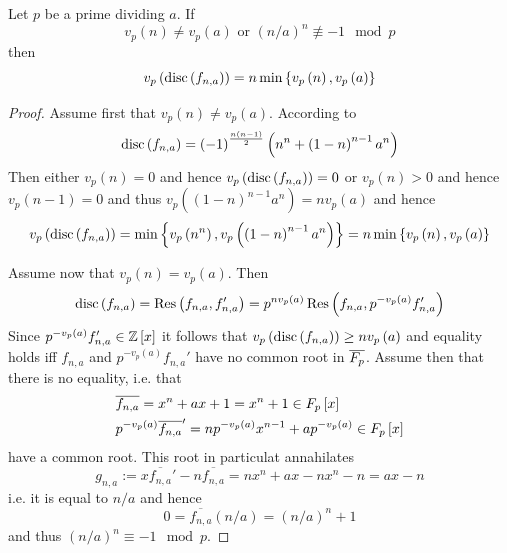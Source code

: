 \documentclass[../main.tex]{subfiles}
\begin{document}
\begin{lemma}
  \label{lem:valuation_of_disc}
  Let $p$ be a prime dividing $a$.
  If 
  \[
    v_p\left( n \right) \neq v_p\left( a \right) \text{ or } \left( n / a \right)^n \not \equiv -1 \mod p
  \]
  then 
  \[
    v_p\left( \operatorname{disc}\left( f_{n,a} \right) \right) = n \min\left\{  
      v_p\left( n \right), v_p\left( a \right) 
    \right\}
  \] 
\end{lemma}
\begin{proof}
  Assume first that $v_p\left( n \right) \neq v_p\left( a \right)$.
  According to \cite[Theorem 2]{Swan62}
  \[
    \operatorname{disc}\left( f_{n,a} \right) = 
    \left( -1 \right)^{\frac{n(n-1)}{2}} \left(  
      n^n + \left( 1 - n \right)^{n - 1} a^n
    \right)
  \]
  Then either $v_p\left( n \right) = 0$ and hence $v_p\left( \operatorname{disc}\left( f_{n,a} \right) \right) = 0$ or $v_p\left( n \right) > 0$ and hence $v_p\left( n - 1 \right) = 0$ and thus $v_p\left( \left( 1 - n \right)^{n - 1} a^n \right) = n v_p\left( a \right)$ and hence 
  \[
    v_p\left( \operatorname{disc}\left( f_{n,a} \right) \right) = 
    \min\left\{ v_p\left( n^n \right), v_p\left( \left( 1 - n \right)^{n - 1} a^n \right) \right\} = 
    n \min\left\{ v_p\left( n \right), v_p\left( a \right) \right\}
  \]
  
  Assume now that $v_p\left( n \right) = v_p\left( a \right)$.
  Then 
  \[
    \operatorname{disc}\left( f_{n,a} \right) = 
    \operatorname{\rm Res}\left( f_{n,a}, f_{n,a}' \right) = 
    p^{n v_p\left( a \right)} \operatorname{\rm Res}\left(  
      f_{n,a},
      p^{-v_p\left( a \right)} f_{n,a}'
    \right)
  \]
  Since $p^{-v_p\left( a \right)} f_{n,a}' \in \mathbb{Z}\left[ x \right]$ it follows that $v_p\left( \operatorname{disc}\left( f_{n,a} \right) \right) \geq n v_p\left( a \right)$ and equality holds iff $f_{n,a}$ and $p^{-v_p\left( a \right)} f_{n,a}'$ have no common root in $\overline{F_p}$.
  Assume then that there is no equality, i.e. that 
  \begin{align*}
    & \overline{f_{n,a}} = x^n + ax + 1 = x^n + 1 \in F_p\left[ x \right] \\
    & p^{-v_p\left( a \right)} \overline{f_{n,a}}' = n p^{-v_p\left( a \right)} x^{n-1} + a p^{-v_p\left( a \right)} \in F_p\left[ x \right]
  \end{align*}
  have a common root.
  This root in particulat annahilates 
  \[
    g_{n,a} := 
    x \overline{f_{n,a}}' - n \overline{f_{n,a}} = 
    n x^n + a x - nx^n - n = 
    a x - n
  \]
  i.e. it is equal to $n / a$ and hence
  \[
    0 = \overline{f_{n,a}}\left( n / a \right) = \left( n / a \right)^n + 1
  \]
  and thus $\left( n / a \right)^n \equiv -1 \mod p$.
\end{proof}
\end{document}
